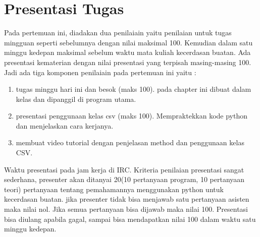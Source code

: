 \section{Presentasi Tugas}
Pada pertemuan ini, diadakan dua penilaiain yaitu penilaian untuk tugas mingguan seperti sebelumnya dengan nilai maksimal 100. Kemudian dalam satu minggu kedepan maksimal sebelum waktu mata kuliah kecerdasan buatan. Ada presentasi kematerian dengan nilai presentasi yang terpisah masing-masing 100. Jadi ada tiga komponen penilaiain pada pertemuan ini yaitu :
\begin{enumerate}
	\item tugas minggu hari ini dan besok (maks 100). pada chapter ini dibuat dalam kelas dan dipanggil di program utama.
	\item presentasi penggunaan kelas csv (maks 100). Mempraktekkan kode python dan menjelaskan cara kerjanya.
	\item membuat video tutorial dengan penjelasan method dan penggunaan kelas CSV.
\end{enumerate}
Waktu presentasi pada jam kerja di IRC. Kriteria penilaian presentasi sangat sederhana, presenter akan ditanyai 20(10 pertanyaan program, 10 pertanyaan teori) pertanyaan tentang pemahamannya menggunakan python untuk kecerdasan buatan. jika presenter tidak bisa menjawab satu pertanyaan asisten maka nilai nol. Jika semua pertanyaan bisa dijawab maka nilai 100. Presentasi bisa diulang apabila gagal, sampai bisa mendapatkan nilai 100 dalam waktu satu minggu kedepan.




